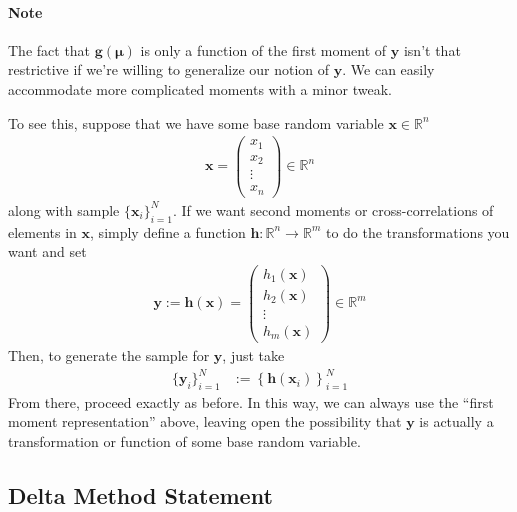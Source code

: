 \documentclass[12pt]{article}
\theoremstyle{plain}
\theoremstyle{definition}
\theoremstyle{remark}
\begin{document}
\paragraph{Note}
The fact that $\boldsymbol{g}(\boldsymbol{\mu})$ is only a function of
the first moment of $\boldsymbol{y}$ isn't that restrictive if we're
willing to generalize our notion of $\boldsymbol{y}$. We can easily
accommodate more complicated moments with a minor tweak.

To see this, suppose that we have some base random variable
$\boldsymbol{x}\in\mathbb{R}^n$
\begin{align*}
  \boldsymbol{x} =
  \begin{pmatrix}
    x_1\\x_2\\\vdots\\x_n
  \end{pmatrix}
  \in \mathbb{R}^n
\end{align*}
along with sample $\{\boldsymbol{x}_i\}_{i=1}^N$. If we want second
moments or cross-correlations of elements in $\boldsymbol{x}$, simply
define a function $\boldsymbol{h}: \mathbb{R}^n \rightarrow
\mathbb{R}^m$ to do the transformations you want and set
\begin{align*}
  \boldsymbol{y}
  :=\boldsymbol{h}(\boldsymbol{x})
  =
  \begin{pmatrix}
    h_1(\boldsymbol{x})\\h_2(\boldsymbol{x})\\\vdots\\h_m(\boldsymbol{x})
  \end{pmatrix}
  \in\mathbb{R}^m
\end{align*}
Then, to generate the sample for $\boldsymbol{y}$, just take
\begin{align*}
  \{\boldsymbol{y}_i\}_{i=1}^N &:=
  \left\{\boldsymbol{h}\left(\boldsymbol{x}_i\right)\right\}_{i=1}^N
\end{align*}
From there, proceed exactly as before. In this way, we can always use
the ``first moment representation'' above, leaving open the possibility
that $\boldsymbol{y}$ is actually a transformation or function of some
base random variable.


\subsection{Delta Method Statement}
\end{document}
